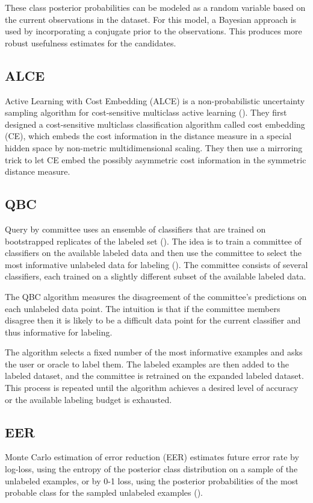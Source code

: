 These class posterior probabilities can be modeled as a random variable based on the current observations in the dataset. For this model, a Bayesian approach is used by incorporating a conjugate prior to the observations. This produces more robust usefulness estimates for the candidates.

\subsection{ALCE}
Active Learning with Cost Embedding (ALCE) is a non-probabilistic uncertainty sampling algorithm for cost-sensitive multiclass active learning (\cite{huang2016alce}). They first designed a cost-sensitive multiclass classification algorithm called cost embedding (CE), which embeds the cost information in the distance measure in a special hidden space by non-metric multidimensional scaling. They then use a mirroring trick to let CE embed the possibly asymmetric cost information in the symmetric distance measure.

\subsection{QBC}
Query by committee uses an ensemble of classifiers that are trained on bootstrapped replicates of the labeled set (\cite{seung1992qbc}). The idea is to train a committee of classifiers on the available labeled data and then use the committee to select the most informative unlabeled data for labeling (\cite{freund1997qbc}). The committee consists of several classifiers, each trained on a slightly different subset of the available labeled data.

The QBC algorithm measures the disagreement of the committee's predictions on each unlabeled data point. The intuition is that if the committee members disagree then it is likely to be a difficult data point for the current classifier and thus informative for labeling.

The algorithm selects a fixed number of the most informative examples and asks the user or oracle to label them. The labeled examples are then added to the labeled dataset, and the committee is retrained on the expanded labeled dataset. This process is repeated until the algorithm achieves a desired level of accuracy or the available labeling budget is exhausted.

\subsection{EER}
Monte Carlo estimation of error reduction (EER) estimates future error rate by log-loss, using the entropy of the posterior class distribution on a sample of the unlabeled examples, or by 0-1 loss, using the posterior probabilities of the most probable class for the sampled unlabeled examples (\cite{roy2001eer}).

